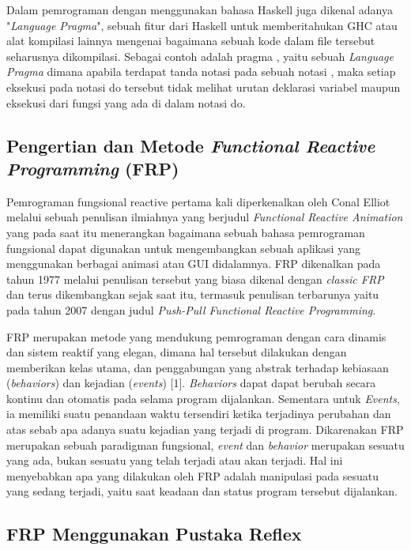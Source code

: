 \documentclass[pi.tex]{subfile}
\begin{document}
   Dalam pemrograman dengan menggunakan bahasa Haskell juga dikenal adanya "\emph{Language Pragma}", sebuah fitur dari Haskell untuk memberitahukan GHC atau alat kompilasi lainnya mengenai bagaimana sebuah kode dalam file tersebut seharusnya dikompilasi. Sebagai contoh adalah pragma , yaitu sebuah \emph{Language Pragma} dimana apabila terdapat tanda notasi  pada sebuah notasi , maka setiap eksekusi pada notasi do tersebut tidak melihat urutan deklarasi variabel maupun eksekusi dari fungsi yang ada di dalam notasi do.

\subsection{Pengertian dan Metode \emph{Functional Reactive Programming} (FRP)}
Pemrograman fungsional reactive pertama kali diperkenalkan oleh Conal Elliot melalui sebuah penulisan ilmiahnya yang berjudul \emph{Functional Reactive Animation} yang pada saat itu menerangkan bagaimana sebuah bahasa pemrograman fungsional dapat digunakan untuk mengembangkan sebuah aplikasi yang menggunakan berbagai animasi atau GUI didalamnya. FRP dikenalkan pada tahun 1977 melalui penulisan tersebut yang biasa dikenal dengan \emph{classic FRP} dan terus dikembangkan sejak saat itu, termasuk penulisan terbarunya yaitu pada tahun 2007 dengan judul \emph{Push-Pull Functional Reactive Programming}.

FRP merupakan metode yang mendukung pemrograman dengan cara dinamis dan sistem reaktif yang elegan, dimana hal tersebut dilakukan dengan memberikan kelas utama, dan penggabungan yang abstrak terhadap kebiasaan (\emph{behaviors}) dan kejadian (\emph{events}) [1]. \emph{Behaviors} dapat dapat berubah secara kontinu dan otomatis pada selama program dijalankan. Sementara untuk \emph{Events}, ia memiliki suatu penandaan waktu tersendiri ketika terjadinya perubahan dan atas sebab apa adanya suatu kejadian yang terjadi di program. Dikarenakan FRP merupakan sebuah paradigman fungsional, \emph{event} dan \emph{behavior} merupakan sesuatu yang ada, bukan sesuatu yang telah terjadi atau akan terjadi. Hal ini menyebabkan apa yang dilakukan oleh FRP adalah manipulasi pada sesuatu yang sedang terjadi, yaitu saat keadaan dan status program tersebut dijalankan.

\subsection{FRP Menggunakan Pustaka Reflex}
\end{document}
